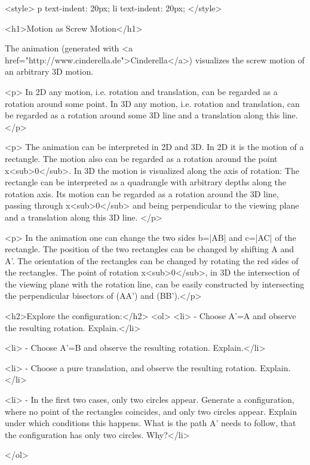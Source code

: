 <style>
p {
  text-indent: 20px;
}
li {
  text-indent: 20px;
}
</style>

<h1>Motion as Screw Motion</h1> 


The  animation (generated with  <a href="http://www.cinderella.de">Cinderella</a>) visualizes the screw motion of an arbitrary 3D motion. 
    
<p> In 2D any motion, i.e. rotation and translation, can be regarded as a rotation around some point. In 3D any motion, i.e. rotation and translation, can be regarded as a rotation around some 3D line and a translation along this line. 
</p>


<p> The animation can be interpreted in 2D and 3D. In 2D it is the motion of a rectangle. The motion also can be regarded as a rotation around the point x<sub>0</sub>. In 3D the motion is visualized along the axis of rotation: The rectangle can be interpreted as a quadrangle with arbitrary depths along the rotation axis. Its motion can be regarded as a rotation around the 3D line, passing through x<sub>0</sub> and being perpendicular to the viewing plane and a translation along this 3D line. </p>

<p> In the animation one can change the two sides b=|AB| and c=|AC| of the rectangle. The position of the two rectangles can be changed by shifting A and A'. The orientation of the rectangles can be changed by rotating the red sides of the rectangles. The point of rotation x<sub>0</sub>, in 3D the intersection of the viewing plane with the rotation line, can be easily constructed by intersecting the perpendicular bisectors of (AA') and (BB').</p>

    

    <h2>Explore the configuration:</h2>
    <ol>
      <li>  - Choose A'=A and observe the resulting rotation. Explain.</li>
			
      <li>  - Choose A'=B and observe the resulting rotation. Explain.</li>
			
 			
 			<li>  - Choose a pure translation, and observe the resulting rotation. Explain.</li>
			
			
			<li>  - In the first two cases, only two circles appear. Generate a configuration, where no point of the rectangles coincides, and only two circles appear. Explain under which conditions this happens. What is the path A' needs to follow, that the configuration has only two circles. Why?</li>
			
			
 			
	    
	        </ol>

